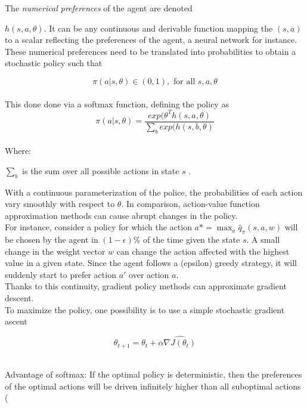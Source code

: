 \documentclass[11pt, onecolumn, a4paper]{report}
\begin{document}
The \textit{numerical preferences} of the agent are denoted \item $h(s,a,\theta)$. It can be any continuous and derivable function mapping the $(s,a)$ to a scalar reflecting the preferences of the agent, a neural network for instance. These numerical preferences need to be translated into probabilities to obtain a stochastic policy such that

$$\pi(a|s,\theta) \in (0,1), \text{ for all } s,a,\theta$$\\

This done done via a softmax function, defining the policy as
$$\pi(a|s,\theta)=\frac{exp(\theta^T h(s,a,\theta)}{\sum_b exp(h(s,b,\theta)}$$\\

Where:
    \item $\sum_b$ is the sum over all possible actions in state $s$ .

With a continuous parameterization of the police, the probabilities of each action vary smoothly with respect to $\theta$. In comparison, action-value function approximation methods can cause abrupt changes in the policy.\\ 

For instance, consider a policy for which the action $a*= \max_a \hat{q}_\pi(s,a,w)$ will be chosen by the agent in $(1-\epsilon) \%$ of the time given the state $s$.  A small change in the weight vector $w$ can change the action affected with the highest value in a given state. Since the agent follows a (epsilon) greedy strategy, it will suddenly start to prefer action $a'$ over action $a$.\\


Thanks to this continuity, gradient policy methods can approximate gradient descent.\\

To maximize the policy, one possibility is to use a simple stochastic gradient ascent
\begin{center}
\begin{equation}
\theta_{t+1}=\theta_{t}+\alpha \widehat{\nabla J(\theta_t)}
\end{equation}
\end{center}\\


Advantage of softmax: If the optimal policy is deterministic, then
the preferences of the optimal actions will be driven infinitely higher than all suboptimal actions (
\end{document}
